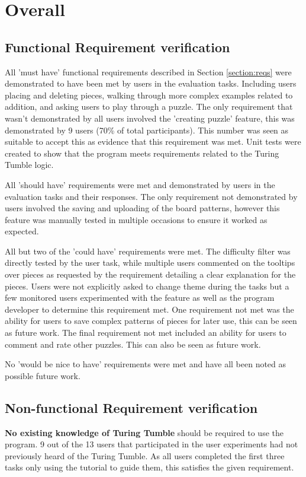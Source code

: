 \documentclass{l4proj}
\begin{document}
\section{Overall}
\subsection{Functional Requirement verification}

All 'must have' functional requirements described in Section \ref{section:reqs} were demonstrated to have been met by users in the evaluation tasks. Including users placing and deleting pieces, walking through more complex examples related to addition, and asking users to play through a puzzle. The only requirement that wasn't demonstrated by all users involved the 'creating puzzle' feature, this was demonstrated by 9 users (70\% of total participants). This number was seen as suitable to accept this as evidence that this requirement was met. Unit tests were created to show that the program meets requirements related to the Turing Tumble logic.

All 'should have' requirements were met and demonstrated by users in the evaluation tasks and their responses. The only requirement not demonstrated by users involved the saving and uploading of the board patterns, however this feature was manually tested in multiple occasions to ensure it worked as expected. 

All but two of the 'could have' requirements were met. The difficulty filter was directly tested by the user task, while multiple users commented on the tooltips over pieces as requested by the requirement detailing a clear explanation for the pieces. Users were not explicitly asked to change theme during the tasks but a few monitored users experimented with the feature as well as the program developer to determine this requirement met. One requirement not met was the ability for users to save complex patterns of pieces for later use, this can be seen as future work. The final requirement not met included an ability for users to comment and rate other puzzles. This can also be seen as future work. 

No 'would be nice to have' requirements were met and have all been noted as possible future work.

\subsection{Non-functional Requirement verification}
\textbf{No existing knowledge of Turing Tumble} should be required to use the program. 9 out of the 13 users that participated in the user experiments had not previously heard of the Turing Tumble. As all users completed the first three tasks only using the tutorial to guide them, this satisfies the given requirement.
\end{document}
